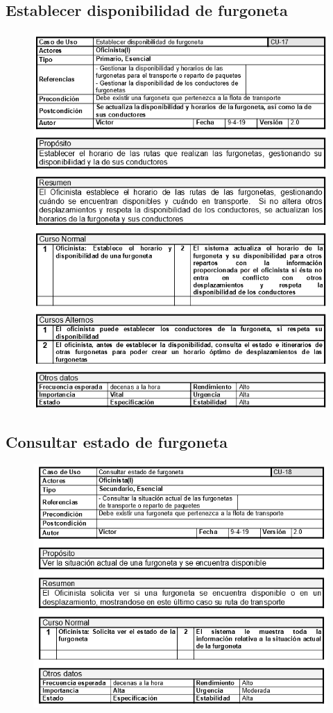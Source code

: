 \subsection{Establecer disponibilidad de furgoneta}
\begin{figure}[H]
	\centering
	\includegraphics[width=16cm]{17}
\end{figure}
\subsection{Consultar estado de furgoneta}
\begin{figure}[H]
	\centering
	\includegraphics[width=16cm]{18}
\end{figure}
